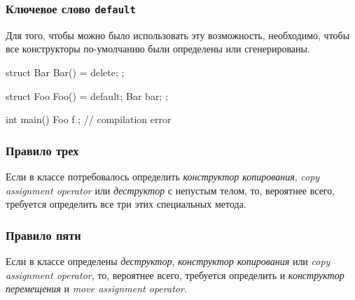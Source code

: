 \documentclass[compress, 8pt, aspectratio=169]{beamer}
\begin{document}
\begin{frame}[fragile]

    \frametitle{Ключевое слово \texttt{default}}

    Для того, чтобы можно было использовать эту возможность, необходимо,
    чтобы все конструкторы по-умолчанию были определены или сгенерированы.

    \begin{myinplacelisting}[minted language=cpp]
struct Bar {
    Bar() = delete;
};

struct Foo {
    Foo() = default;
    Bar bar;
};

int main() {
    Foo f {}; // compilation error
}
    \end{myinplacelisting}

\end{frame}

\begin{frame}[fragile]

    \frametitle{Правило трех}

    Если в классе потребовалось определить \textit{конструктор копирования},
    \textit{copy assignment operator} или \textit{деструктор} с непустым телом, то,
    вероятнее всего, требуется определить все три этих специальных метода.

\end{frame}

\begin{frame}[fragile]

    \frametitle{Правило пяти}

    Если в классе определены \textit{деструктор}, \textit{конструктор копирования} или
    \textit{copy assignment operator}, то, вероятнее всего, требуется определить и
    \textit{конструктор перемещения} и \textit{move assignment operator}.


\end{frame}
\end{document}
